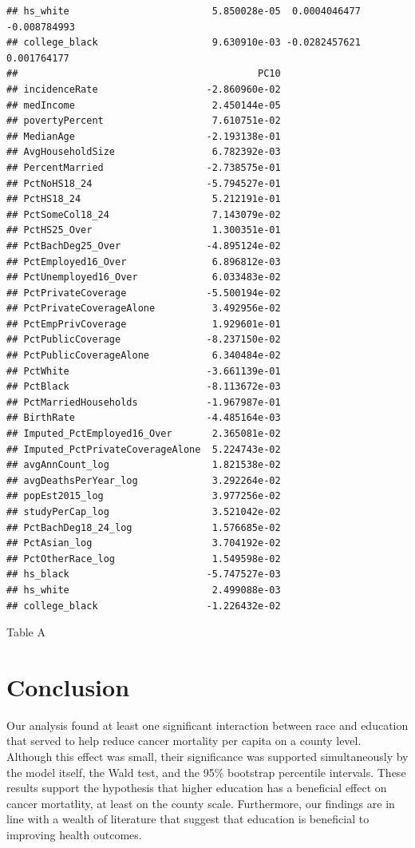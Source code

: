 \documentclass[
  11pt,
]{article}
\begin{document}
\begin{verbatim}
## hs_white                         5.850028e-05  0.0004046477 -0.008784993
## college_black                    9.630910e-03 -0.0282457621  0.001764177
##                                          PC10
## incidenceRate                   -2.860960e-02
## medIncome                        2.450144e-05
## povertyPercent                   7.610751e-02
## MedianAge                       -2.193138e-01
## AvgHouseholdSize                 6.782392e-03
## PercentMarried                  -2.738575e-01
## PctNoHS18_24                    -5.794527e-01
## PctHS18_24                       5.212191e-01
## PctSomeCol18_24                  7.143079e-02
## PctHS25_Over                     1.300351e-01
## PctBachDeg25_Over               -4.895124e-02
## PctEmployed16_Over               6.896812e-03
## PctUnemployed16_Over             6.033483e-02
## PctPrivateCoverage              -5.500194e-02
## PctPrivateCoverageAlone          3.492956e-02
## PctEmpPrivCoverage               1.929601e-01
## PctPublicCoverage               -8.237150e-02
## PctPublicCoverageAlone           6.340484e-02
## PctWhite                        -3.661139e-01
## PctBlack                        -8.113672e-03
## PctMarriedHouseholds            -1.967987e-01
## BirthRate                       -4.485164e-03
## Imputed_PctEmployed16_Over       2.365081e-02
## Imputed_PctPrivateCoverageAlone  5.224743e-02
## avgAnnCount_log                  1.821538e-02
## avgDeathsPerYear_log             3.292264e-02
## popEst2015_log                   3.977256e-02
## studyPerCap_log                  3.521042e-02
## PctBachDeg18_24_log              1.576685e-02
## PctAsian_log                     3.704192e-02
## PctOtherRace_log                 1.549598e-02
## hs_black                        -5.747527e-03
## hs_white                         2.499088e-03
## college_black                   -1.226432e-02
\end{verbatim}

Table A

\hypertarget{conclusion}{%
\section{Conclusion}\label{conclusion}}

Our analysis found at least one significant interaction between race and
education that served to help reduce cancer mortality per capita on a
county level. Although this effect was small, their significance was
supported simultaneously by the model itself, the Wald test, and the
95\% bootstrap percentile intervals. These results support the
hypothesis that higher education has a beneficial effect on cancer
mortatlity, at least on the county scale. Furthermore, our findings are
in line with a wealth of literature that suggest that education is
beneficial to improving health outcomes.
\end{document}
